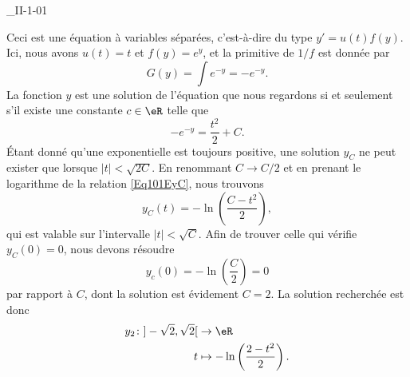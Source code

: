 

\begin{corrige}{_II-1-01}

Ceci est une équation à variables séparées, c'est-à-dire du type $y'=u(t)f(y)$. Ici, nous avons $u(t)=t$ et $f(y)= e^{y}$, et la primitive de $1/f$ est donnée par
\begin{equation}
	G(y)=\int e^{-y}=- e^{-y}.
\end{equation}
La fonction $y$ est une solution de l'équation que nous regardons si et seulement s'il existe une constante $c\in\eR$ telle que
\begin{equation}		\label{Eq101EyC}
	- e^{-y}=\frac{ t^2 }{ 2 }+C.
\end{equation}
Étant donné qu'une exponentielle est toujours positive, une solution $y_C$ ne peut exister que lorsque $| t |<\sqrt{2C}$. En renommant $C\to C/2$ et en prenant le logarithme de la relation \eqref{Eq101EyC}, nous trouvons
\begin{equation}
	y_C(t)=-\ln\left( \frac{ C-t^2 }{ 2 } \right),
\end{equation}
qui est valable sur l'intervalle $| t |<\sqrt{C}$. Afin de trouver celle qui vérifie $y_C(0)=0$, nous devons résoudre
\begin{equation}
	y_c(0)=-\ln\left( \frac{ C }{ 2 } \right)=0
\end{equation}
par rapport à $C$, dont la solution est évidement $C=2$. La solution recherchée est donc
\begin{equation}
	\begin{aligned}
		y_2\colon ]-\sqrt{2},\sqrt{2}[&\to \eR \\
		t&\mapsto -\ln\left( \frac{ 2-t^2 }{2} \right).
	\end{aligned}
\end{equation}

\end{corrige}
